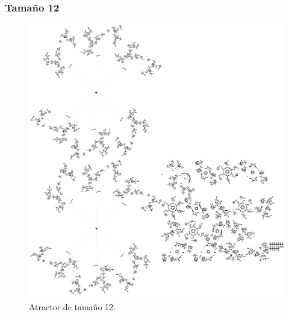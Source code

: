 \documentclass[11pt]{article}
\begin{document}
			\subsubsection{Tamaño 12}
			\begin{figure}[H]
			\centering
			\includegraphics[scale=0.1]{resources/Atractores54/atractor_54_size_12.png}
			\caption{Atractor de tamaño 12.}\label{fig:picture}
			\end{figure}
\end{document}
